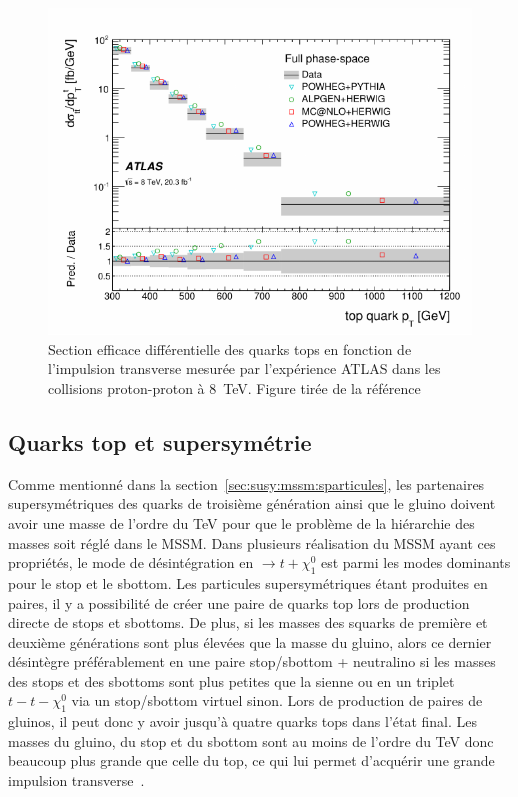 \begin{figure}
  \centering
  \includegraphics{boosted_top_pt.pdf}
  \caption{Section efficace différentielle des quarks tops en fonction
    de l'impulsion transverse mesurée par l'expérience ATLAS dans les
    collisions proton-proton à 8~TeV. Figure tirée de la
    référence~\cite{atlas_collaboration_measurement_2015}}
  \label{fig:boosted_top_pt}
\end{figure}

\subsection{Quarks top et supersymétrie}
\label{sec:top:boosted:susy}

Comme mentionné dans la section~\ref{sec:susy:mssm:sparticules}, les
partenaires supersymétriques des quarks de troisième génération ainsi
que le gluino doivent avoir une masse de l'ordre du TeV pour que le
problème de la hiérarchie des masses soit réglé dans le MSSM.  Dans
plusieurs réalisation du MSSM ayant ces propriétés, le mode de
désintégration en $\rightarrow t + \chi_1^0$ est parmi les modes
dominants pour le stop et le sbottom. Les particules supersymétriques
étant produites en paires, il y a possibilité de créer une paire de
quarks top lors de production directe de stops et sbottoms. De plus,
si les masses des squarks de première et deuxième générations sont
plus élevées que la masse du gluino, alors ce dernier désintègre
préférablement en une paire stop/sbottom + neutralino si les masses
des stops et des sbottoms sont plus petites que la sienne ou en un
triplet $t-t-\chi_1^0$ via un stop/sbottom virtuel sinon.  Lors de
production de paires de gluinos, il peut donc y avoir jusqu'à quatre
quarks tops dans l'état final. Les masses du gluino, du stop et du
sbottom sont au moins de l'ordre du TeV donc beaucoup plus grande que
celle du top, ce qui lui permet d'acquérir une grande impulsion
transverse~\cite{bandyopadhyay_boosted_2011}.

